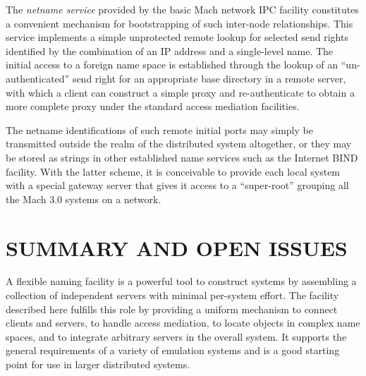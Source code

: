 The {\em netname service} provided by the basic Mach network IPC
facility constitutes a convenient mechanism for bootstrapping of such
inter-node relationships.  This service implements a simple
unprotected remote lookup for selected send rights identified by the
combination of an IP address and a single-level name. The initial
access to a foreign name space is established through the lookup of an
``un-authenticated'' send right for an appropriate base directory in a
remote server, with which a client can construct a simple proxy and
re-authenticate to obtain a more complete proxy under the standard
access mediation facilities.

The netname identifications of such remote initial ports may simply be
transmitted outside the realm of the distributed system altogether, or
they may be stored as strings in other established name services such
as the Internet BIND facility\cite{BLOOM86}. With the latter scheme,
it is conceivable to provide each local system with a special gateway
server that gives it access to a ``super-root'' grouping all the Mach
3.0 systems on a network.

\section{SUMMARY AND OPEN ISSUES}

A flexible naming facility is a powerful tool to construct systems by
assembling a collection of independent servers with minimal per-system
effort. The facility described here fulfills this role by providing a
uniform mechanism to connect clients and servers, to handle access
mediation, to locate objects in complex name spaces, and to integrate
arbitrary servers in the overall system. It supports the general
requirements of a variety of emulation systems and is a good starting
point for use in larger distributed systems.

